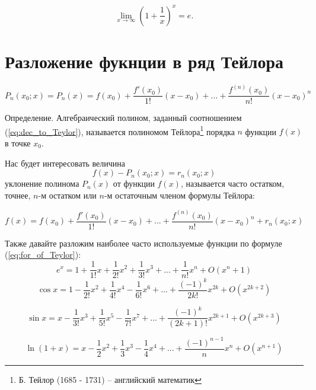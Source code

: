 \documentclass[a4paper, 12pt]{article} %
\begin{document}
\begin{equation}
    \lim _{{x\to \infty }}\left(1+{\frac  {1}{x}}\right)^{x}=e.
\end{equation}

\clearpage


\section*{Разложение фукнции в ряд Тейлора}

\begin{equation}
    P_n(x_0; x) = P_n(x) = f(x_0) + \frac{f'(x_0)}{1!}(x - x_0) + ... + \frac{f^{(n)}(x_0)}{n!}(x - x_0)^n
    \label{eq:dec_to_Teylor}
\end{equation}

Определение. Алгебраический полином, заданный соотношением (\ref{eq:dec_to_Teylor}), называется полиномом Тейлора\footnote{Б. Тейлор (1685 - 1731) -- английский математик} порядка $n$ функции $f(x)$ в точке $x_0$.

Нас будет интересовать величина
\begin{equation}
    f(x) - P_n(x_0; x) = r_n(x_0; x)
\end{equation}
уклонение полинома $P_n(x)$ от функции $f(x)$, называется часто остатком, точнее, $n$-м остатком или $n$-м остаточным членом формулы Тейлора:

\begin{equation}
    f(x) = f(x_0) + \frac{f'(x_0)}{1!} (x - x_0) + ... + \frac{f^{(n)}(x_0)}{n!} (x - x_0)^n + r_n (x_0; x)
    \label{eq:for_of_Teylor}
\end{equation}

Также давайте разложим наиболее часто используемые функции по формуле (\ref{eq:for_of_Teylor}):
\begin{equation}
    e^x = 1 + \frac{1}{1!}x + \frac{1}{2!}x^2 + \frac{1}{3!}x^3 + ... + \frac{1}{n!}x^n + O(x^n + 1)
\end{equation}
\begin{equation}
    \cos x = 1 - \frac{1}{2!}x^2 + \frac{1}{4!}x^4 - \frac{1}{6!}x^6 + ... + \frac{(-1)^k}{2k!}x^{2k} + O(x^{2k+2})
\end{equation}

\begin{equation}
    \sin x = x - \frac{1}{3!}x^3 + \frac{1}{5!}x^5 - \frac{1}{7!}x^7 + ... + \frac{(-1)^k}{(2k + 1)!}x^{2k + 1} + O(x^{2k+3})
\end{equation}

\begin{equation}
    \ln(1 + x) = x - \frac{1}{2}x^2 + \frac{1}{3}x^3 - \frac{1}{4}x^4 + ... + \frac{(-1)^{n - 1}}{n}x^n + O(x^{n + 1})
\end{equation}
\end{document}
